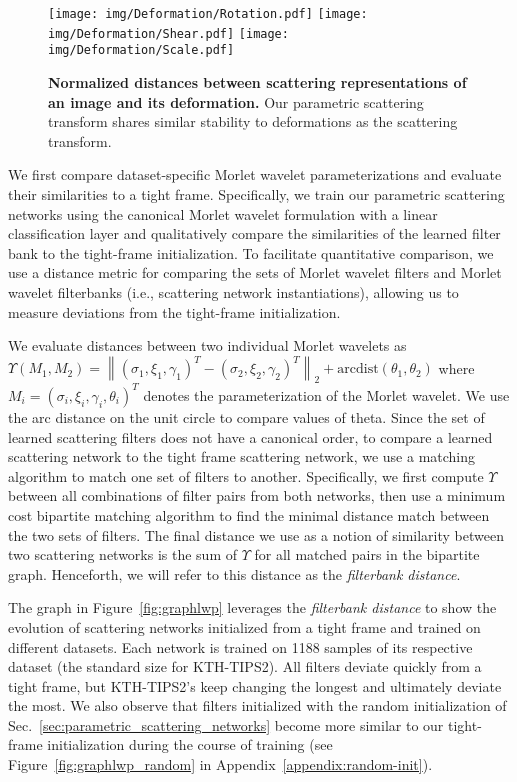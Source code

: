 \documentclass[10pt,twocolumn,letterpaper]{article}
\begin{document}
\begin{figure*}
    \centering
    \texttt{[image: img/Deformation/Rotation.pdf]}
    \texttt{[image: img/Deformation/Shear.pdf]}
    \texttt{[image: img/Deformation/Scale.pdf]}
    \vspace{-15pt}
    \caption{\textbf{Normalized distances between scattering representations of an image and its deformation.} Our parametric scattering transform shares similar stability to deformations as the scattering transform.   }\label{fig:defo}
\vspace{-12pt}
\end{figure*}
We first compare dataset-specific Morlet wavelet parameterizations and evaluate their similarities to a tight frame. Specifically, we train our parametric scattering networks using the canonical Morlet wavelet formulation with a linear classification layer and qualitatively compare the similarities of the learned filter bank to the tight-frame initialization. To facilitate quantitative comparison, we use a distance metric for comparing the sets of Morlet wavelet filters and Morlet wavelet filterbanks (i.e., scattering network instantiations), allowing us to measure deviations from the tight-frame initialization. 

We evaluate distances between two individual Morlet wavelets as $\Upsilon(M_1,M_2) = \left\| (\sigma_1,\xi_1,\gamma_1)^T - (\sigma_2,\xi_2,\gamma_2)^T  \right\|_2 + \textrm{arcdist}(\theta_1,\theta_2)
$ where $M_i=(\sigma_i,\xi_i,\gamma_i,\theta_i)^T$ denotes the parameterization of the Morlet wavelet. We use the arc distance on the unit circle to compare values of theta. Since the set of learned scattering filters does not have a canonical order, to compare a learned scattering network to the tight frame scattering network, we use a matching algorithm to match one set of filters to another. Specifically, we first compute $\Upsilon$ between all combinations of filter pairs from both networks, then use a minimum cost bipartite matching algorithm \cite{kuhn1955} to find the minimal distance match between the two sets of filters. The final distance we use as a notion of similarity between two scattering networks is the sum of $\Upsilon$ for all matched pairs in the bipartite graph. Henceforth, we will refer to this distance as the \textit{filterbank distance}. 







The graph in Figure~\ref{fig:graphlwp} leverages the \textit{filterbank distance} to show the evolution of scattering networks initialized from a tight frame and trained on different datasets. Each network is trained on 1188 samples of its respective dataset (the standard size for KTH-TIPS2). All filters deviate quickly from a tight frame, but KTH-TIPS2's keep changing the longest and ultimately deviate the most. We also observe that filters initialized with the random initialization of Sec.~\ref{sec:parametric_scattering_networks} become more similar to our tight-frame initialization during the course of training (see Figure~\ref{fig:graphlwp_random} in Appendix~\ref{appendix:random-init}). 
\end{document}
